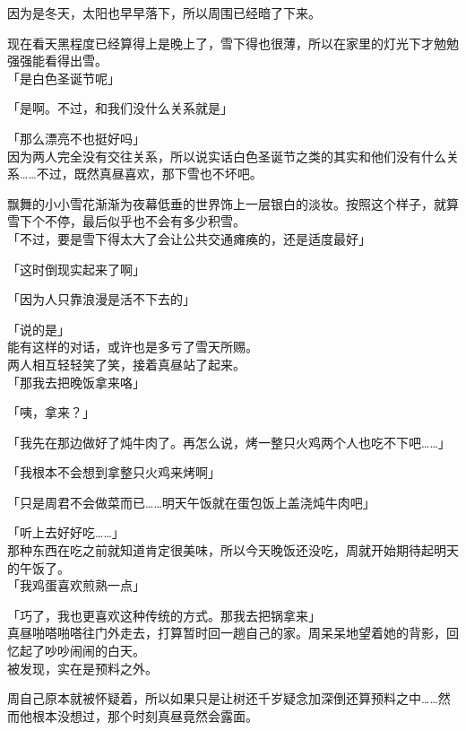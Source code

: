 因为是冬天，太阳也早早落下，所以周围已经暗了下来。

现在看天黑程度已经算得上是晚上了，雪下得也很薄，所以在家里的灯光下才勉勉强强能看得出雪。\\

「是白色圣诞节呢」

「是啊。不过，和我们没什么关系就是」

「那么漂亮不也挺好吗」\\

因为两人完全没有交往关系，所以说实话白色圣诞节之类的其实和他们没有什么关系……不过，既然真昼喜欢，那下雪也不坏吧。

飘舞的小小雪花渐渐为夜幕低垂的世界饰上一层银白的淡妆。按照这个样子，就算雪下个不停，最后似乎也不会有多少积雪。\\

「不过，要是雪下得太大了会让公共交通瘫痪的，还是适度最好」

「这时倒现实起来了啊」

「因为人只靠浪漫是活不下去的」

「说的是」\\

能有这样的对话，或许也是多亏了雪天所赐。\\

两人相互轻轻笑了笑，接着真昼站了起来。\\

「那我去把晚饭拿来咯」

「咦，拿来？」

「我先在那边做好了炖牛肉了。再怎么说，烤一整只火鸡两个人也吃不下吧……」

「我根本不会想到拿整只火鸡来烤啊」

「只是周君不会做菜而已……明天午饭就在蛋包饭上盖浇炖牛肉吧」

「听上去好好吃……」\\

那种东西在吃之前就知道肯定很美味，所以今天晚饭还没吃，周就开始期待起明天的午饭了。\\

「我鸡蛋喜欢煎熟一点」

「巧了，我也更喜欢这种传统的方式。那我去把锅拿来」\\

真昼啪嗒啪嗒往门外走去，打算暂时回一趟自己的家。周呆呆地望着她的背影，回忆起了吵吵闹闹的白天。\\

被发现，实在是预料之外。

周自己原本就被怀疑着，所以如果只是让树还千岁疑念加深倒还算预料之中……然而他根本没想过，那个时刻真昼竟然会露面。\\

